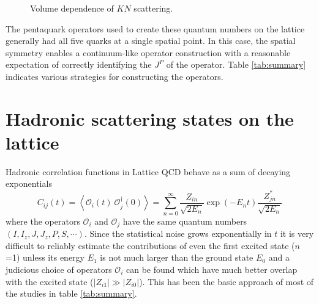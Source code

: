 \documentclass[letterpaper]{jpconf}
\begin{document}
\begin{figure}[h]
\begin{minipage}{14pc}
\begin{center}
    \caption{\label{fig:KNscattering}Volume dependence of $KN$ scattering.}
  \end{center}
\end{minipage}
\end{figure}

The pentaquark operators used to create these quantum numbers on the lattice
generally had all five quarks at a single spatial point.  In this case, the
spatial symmetry enables a continuum-like operator construction with a
reasonable expectation of correctly identifying the $J^P$ of the operator.
Table \ref{tab:summary} indicates various strategies for constructing the
operators.

\section{\label{sec:scattering_states}Hadronic scattering states
        on the lattice}

Hadronic correlation functions in Lattice QCD behave as a sum of decaying
exponentials
%
\begin{equation}
\label{eq:correlator}
C_{ij}(t) = \left\langle
  \mathcal{O}_i(t)\ \mathcal{O}_j^\dagger(0)
\right\rangle = \sum_{n=0}^\infty \frac{Z_{in}}{\sqrt{2 E_n}}
\exp\left( - E_n t \right) \frac{Z_{jn}^*}{\sqrt{2 E_n}}
\end{equation}
%
where the operators $\mathcal{O}_i$ and $\mathcal{O}_j$ have the same quantum
numbers $(I, I_z, J, J_z, P, S, \cdots)$.  Since the statistical noise grows
exponentially in $t$ it is very difficult to reliably estimate the
contributions of even the first excited state ($n$=1) unless its energy $E_1$
is not much larger than the ground state $E_0$ and a judicious choice of
operators $\mathcal{O}_i$ can be found which have much better overlap with the
excited state ($\left| Z_{i1} \right| \gg \left| Z_{i0} \right|$).  This has
been the basic approach of most of the studies in table \ref{tab:summary}.
\end{document}

